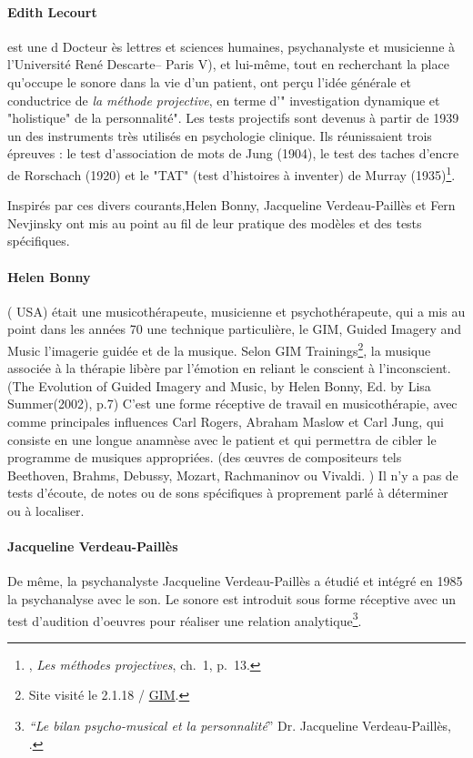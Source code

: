         \paragraph*{Edith Lecourt} est une d Docteur ès lettres et sciences humaines, psychanalyste et musicienne à l'Université René Descarte-- Paris V), et lui-même, tout en recherchant la place qu'occupe le sonore dans la vie d'un patient, ont perçu l'idée générale et conductrice de \textsl{la méthode projective}, en terme 
	d'" investigation dynamique et "holistique" de la
        personnalité". Les tests projectifs sont devenus à partir
        de 1939 un des instruments très utilisés en psychologie
        clinique. Ils réunissaient trois épreuves : le test
        d'association de mots de Jung (1904), le test des taches
        d'encre de Rorschach (1920) et le "TAT" (test d'histoires à
        inventer) de Murray (1935)\footnote{\cite{ChabertAnzieu}, \emph{Les méthodes projectives}, ch.~1, p.~13.}.
		

	
Inspirés par ces divers courants,Helen Bonny, Jacqueline Verdeau-Paillès et Fern Nevjinsky ont  mis au point au fil de leur pratique des modèles et des tests spécifiques. 


\paragraph{Helen Bonny } ( USA) était une musicothérapeute,
musicienne et psychothérapeute, qui a mis au point dans les années 70
une technique particulière, le GIM, \og Guided Imagery and Music\fg
l'imagerie guidée et de la musique. Selon GIM
Trainings\footnote{Site visité le 2.1.18 / \href{\#gimsite}{GIM}.}, la
musique associée à la thérapie libère par l'émotion en reliant le
conscient à l'inconscient.(The Evolution of Guided Imagery and Music, by Helen Bonny, Ed. by Lisa Summer(2002), p.7)
 C'est une forme réceptive de travail
en musicothérapie, avec comme principales influences Carl Rogers, Abraham Maslow et Carl Jung,  qui consiste en une longue anamnèse avec le
patient et  qui permettra de cibler le programme de musiques appropriées. 
(des \oe uvres de compositeurs tels Beethoven, Brahms, Debussy,
Mozart, Rachmaninov ou Vivaldi. )
Il n'y a  pas de
tests d'écoute, de notes ou de sons spécifiques à proprement parlé à déterminer ou à localiser.

\paragraph{Jacqueline Verdeau-Paillès}De même, la psychanalyste Jacqueline Verdeau-Paillès a étudié et
intégré en 1985 la psychanalyse avec le son.  Le sonore est  introduit
sous forme réceptive avec un test d'audition d'oeuvres pour réaliser
une relation analytique\footnote{\emph{``Le bilan psycho-musical et la
    personnalité}'' Dr. Jacqueline Verdeau-Paillès,
  \cite{verdeau-pailles}.}.

